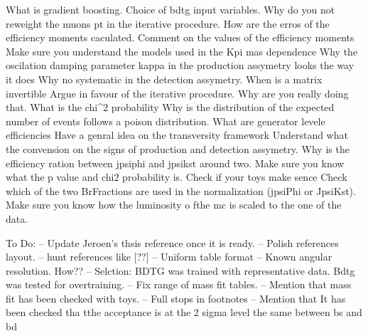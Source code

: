 
What is gradient boosting.
Choice of bdtg input variables.
Why do you not reweight the muons pt in the iterative procedure.
How are the erros of the efficiency moments caculated. 
Comment on the values of the efficiency moments
Make sure you understand the models used in the Kpi mas dependence
Why the oscilation damping parameter kappa in the production assymetry looks the way it does 
Why no systematic in the detection assymetry.
When is a matrix invertible
Argue in favour of the iterative procedure. Why are you really doing that.
What is the chi^2 probability
Why is the distribution of the expected number of events follows a poison distribution.
What are generator levele efficiencies
Have a genral idea on the transversity framework
Understand what the convension on the signs of production and detection assymetry.
Why is the efficiency ration between jpsiphi and jpsikst around two.
Make sure you know what the p value and chi2 probability is.
Check if your toys make sence
Check which of the two BrFractions are used in the normalization (jpsiPhi or JpsiKst).
Make sure you know how the luminosity o fthe mc is scaled to the one of the data.

To Do:
-- Update Jeroen's thsis reference once it is ready.
-- Polish references layout.
-- hunt references like [??]
-- Uniform table format
-- Known angular resolution. How??
-- Selction: BDTG was trained with representative data. Bdtg was tested for overtraining.
-- Fix range of mass fit tables.
-- Mention that mass fit has been checked with toys.
-- Full stops in footnotes
-- Mention that It has been checked tha tthe acceptance is at the 2 sigma level the same between bs and bd
